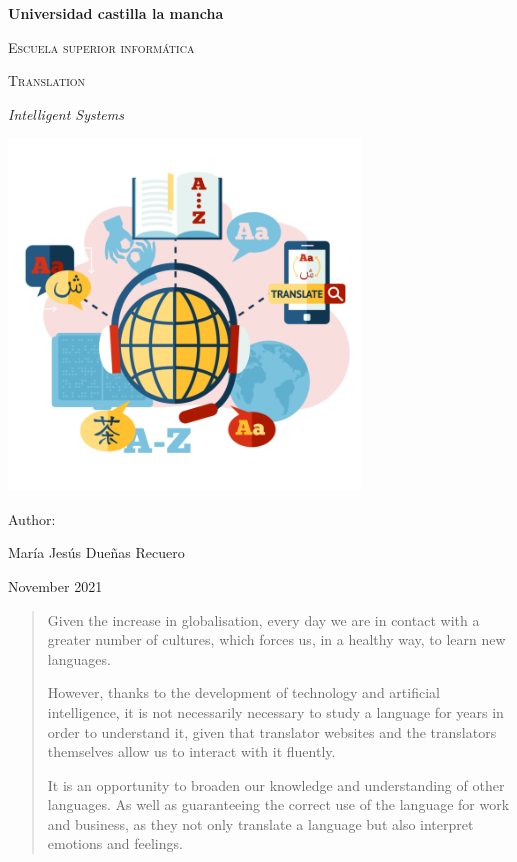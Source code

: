 \documentclass[a4paper]{article}
\theoremstyle{plain}
\theoremstyle{definition}
\begin{document}
\begin{titlepage}
    \centering
    {\bfseries\LARGE Universidad castilla la mancha\par}
    \vspace{1cm}
    {\scshape\Large Escuela superior informática\par}
    \vspace{2cm}
    {\scshape\Huge Translation \par}
    \vspace{2cm}
    {\itshape\Large Intelligent Systems \par}
    \includegraphics[width=0.7\textwidth]{INTERPRETACION-O1-800x800.png}
    \vfill
    {\Large Author: \par}
    {\Large María Jesús Dueñas Recuero\par}
    \vfill
    {\Large November 2021 \par}
    
   
\end{titlepage}
\begin{abstract}
    Given the increase in globalisation, every day we are in contact with a greater number of cultures, which forces us, in a healthy way, to learn new languages.\newline

	However, thanks to the development of technology and artificial intelligence, it is not necessarily necessary to study a language for years in order to understand it, given that translator websites and the translators themselves allow us to interact with it fluently.\newline

	It is an opportunity to broaden our knowledge and understanding of other languages. As well as guaranteeing the correct use of the language for work and business, as they not only translate a language but also interpret emotions and feelings.
\end{abstract}
\end{document}
